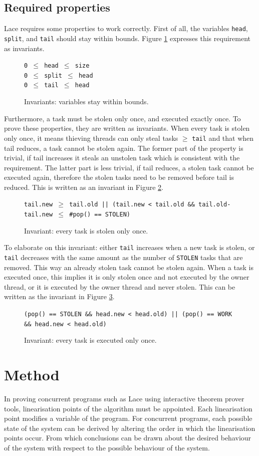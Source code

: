 \documentclass{sig-alternate-br}
\begin{document}
\subsection{Required properties}
Lace requires some properties to work correctly.
First of all, the variables \texttt{head}, \texttt{split}, and \texttt{tail} should stay within bounds.
Figure \ref{inv:bounds} expresses this requirement as invariants. 
\begin{figure}[h]
	\texttt{0 $\leq$ head $\leq$ size}\\
	\texttt{0 $\leq$ split $\leq$ head}\\
	\texttt{0 $\leq$ tail $\leq$ head}
	\caption{Invariants: variables stay within bounds.}
	\label{inv:bounds}
\end{figure}
Furthermore, a task must be stolen only once, and executed exactly once.
To prove these properties, they are written as invariants.
When every task is stolen only once, it means thieving threads can only steal tasks $\geq$ \texttt{tail} and that when tail reduces, a task cannot be stolen again. The former part of the property is trivial, if tail increases it steals an unstolen task which is consistent with the requirement. The latter part is less trivial, if tail reduces, a stolen task cannot be executed again, therefore the stolen tasks need to be removed before tail is reduced. This is written as an invariant in Figure \ref{inv:stolen}.
\begin{figure}[h]
	\texttt{tail.new $\geq$ tail.old || (tail.new < tail.old \&\& tail.old-tail.new $\leq$ \#pop() == STOLEN)}
	\caption{Invariant: every task is stolen only once.}
	\label{inv:stolen}
\end{figure}
To elaborate on this invariant: either \texttt{tail} increases when a new task is stolen, or \texttt{tail} decreases with the same amount as the number of \texttt{STOLEN} tasks that are removed. This way an already stolen task cannot be stolen again.
When a task is executed once, this implies it is only stolen once and not executed by the owner thread, or it is executed by the owner thread and never stolen. This can be written as the invariant in Figure \ref{inv:exec}.
\begin{figure}[h]
	\texttt{(pop() == STOLEN \&\& head.new < head.old) || (pop() == WORK \&\& head.new < head.old)}
	\caption{Invariant: every task is executed only once.}
	\label{inv:exec}
\end{figure}

\section{Method}
In proving concurrent programs such as Lace using interactive theorem prover tools, linearisation points of the algorithm must be appointed.
Each linearisation point modifies a variable of the program.
For concurrent programs, each possible state of the system can be derived by altering the order in which the linearisation points occur.
From which conclusions can be drawn about the desired behaviour of the system with respect to the possible behaviour of the system.
\end{document}
